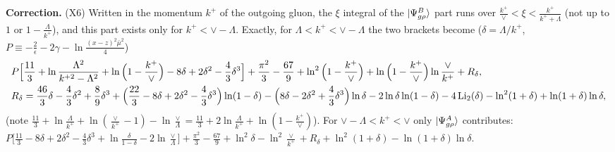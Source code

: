 \documentclass[aps,prd,amsmath,amssymb,nofootinbib]{revtex4-2}
\numberwithin{equation}{section}
\begin{document}
{\color{blue}\noindent\textbf{Correction.} (X6) Written in the momentum $k^+$ of the outgoing gluon, the $\xi$ integral of the $\ket{\Psi^B_{g\rho}}$ part runs over $\frac{k^+}{\vee}<\xi<\frac{k^+}{k^++\Lambda}$ (not up to $1$ or $1-\frac{\Lambda}{k^+}$), and this part exists only for $k^+<\vee-\Lambda$. Exactly, for $\Lambda<k^+<\vee-\Lambda$ the two brackets become ($\delta=\Lambda/k^+$, $P\equiv-\frac2\epsilon-2\gamma-\ln\frac{(x-z)^2\bar\mu^2}{4}$)
\begin{align*}
&P\Big[\frac{11}{3}+\ln\frac{\Lambda^2}{k^{+2}-\Lambda^2}+\ln\Big(1-\frac{k^+}{\vee}\Big)-8\delta+2\delta^2-\frac43\delta^3\Big]+\frac{\pi^2}{3}-\frac{67}{9}+\ln^2\Big(1-\frac{k^+}{\vee}\Big)+\ln\Big(1-\frac{k^+}{\vee}\Big)\ln\frac{\vee}{k^+}+R_\delta,\\
&R_\delta=\frac{46}{3}\delta-\frac43\delta^2+\frac89\delta^3+\Big(\frac{22}{3}-8\delta+2\delta^2-\frac43\delta^3\Big)\ln(1-\delta)-\Big(8\delta-2\delta^2+\frac43\delta^3\Big)\ln\delta-2\ln\delta\ln(1-\delta)-4\,{\rm Li}_2(\delta)-\ln^2(1+\delta)+\ln(1+\delta)\ln\delta,
\end{align*}
(note $\frac{11}{3}+\ln\frac{\Lambda}{k^+}+\ln(\frac{\vee}{k^+}-1)-\ln\frac{\vee}{\Lambda}=\frac{11}{3}+2\ln\frac{\Lambda}{k^+}+\ln(1-\frac{k^+}{\vee})$). For $\vee-\Lambda<k^+<\vee$ only $\ket{\Psi^A_{g\rho}}$ contributes:
$P\big[\frac{11}{3}-8\delta+2\delta^2-\frac43\delta^3+\ln\frac{\delta}{1-\delta}-2\ln\frac{\vee}{\Lambda}\big]+\frac{\pi^2}{3}-\frac{67}{9}+\ln^2\delta-\ln^2\frac{\vee}{k^+}+R_\delta+\ln^2(1+\delta)-\ln(1+\delta)\ln\delta$.}
\end{document}
